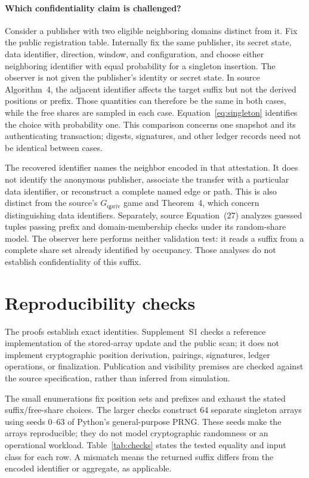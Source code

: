 \paragraph{Which confidentiality claim is challenged?}
Consider a publisher with two eligible neighboring domains distinct from it.
Fix the public registration table. Internally fix the same publisher, its
secret state, data identifier, direction, window, and configuration, and choose
either neighboring identifier with equal probability for a singleton insertion.
The observer is not given the publisher's identity or secret state. In source
Algorithm~4, the adjacent identifier affects the target suffix but not the
derived positions or prefix. Those quantities can therefore be the same in
both cases, while the free shares are sampled in each case.
Equation~\eqref{eq:singleton} identifies the choice with probability one.
This comparison concerns one snapshot and its authenticating transaction;
digests, signatures, and other ledger records need not be identical between cases.

The recovered identifier names the neighbor encoded in that attestation.
It does not identify the anonymous publisher, associate the transfer with a
particular data identifier, or reconstruct a complete named edge or path.
This is also distinct from the source's $G_{\mathrm{qpriv}}$ game and
Theorem~4, which concern distinguishing data identifiers. Separately, source
Equation~(27) analyzes guessed tuples passing prefix and domain-membership
checks under its random-share model. The observer here performs neither
validation test: it reads a suffix from a complete share set already identified
by occupancy. Those analyses do not establish confidentiality of this suffix.

\section{Reproducibility checks}

The proofs establish exact identities. Supplement~S1 checks a reference
implementation of the stored-array update and the public scan; it does not
implement cryptographic position derivation, pairings, signatures, ledger
operations, or finalization. Publication and visibility premises are checked
against the source specification, rather than inferred from simulation.

The small enumerations fix position sets and prefixes and exhaust the stated
suffix/free-share choices. The larger checks construct 64 separate singleton
arrays using seeds $0$--$63$ of Python's general-purpose PRNG. These seeds
make the arrays reproducible; they do not model cryptographic randomness or
an operational workload. Table~\ref{tab:checks} states the tested equality
and input class for each row. A mismatch means the returned suffix differs
from the encoded identifier or aggregate, as applicable.

